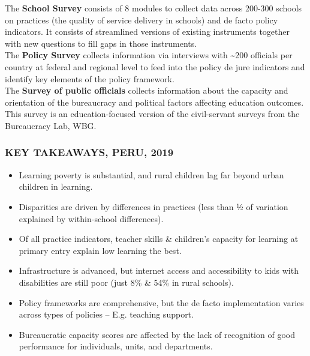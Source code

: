 \documentclass[twocolumn]{article}
\providecommand{\tightlist}{%
  \setlength{\itemsep}{0pt}\setlength{\parskip}{0pt}}
\begin{document}
The \textbf{School Survey} consists of 8 modules to collect data across
200-300 schools on practices (the quality of service delivery in
schools) and de facto policy indicators. It consists of streamlined
versions of existing instruments together with new questions to fill
gaps in those instruments.\\
The \textbf{Policy Survey} collects information via interviews with
\textasciitilde{}200 officials per country at federal and regional level
to feed into the policy de jure indicators and identify key elements of
the policy framework.\\
The \textbf{Survey of public officials} collects information about the
capacity and orientation of the bureaucracy and political factors
affecting education outcomes. This survey is an education-focused
version of the civil-servant surveys from the Bureaucracy Lab, WBG.

\hypertarget{key-takeaways-2019}{%
\subsubsection{\texorpdfstring{\textbf{KEY TAKEAWAYS, \uppercase{Peru},
2019}}{KEY TAKEAWAYS, , 2019}}\label{key-takeaways-2019}}

\begin{itemize}
\tightlist
\item
  Learning poverty is substantial, and rural children lag far beyond
  urban children in learning.
\item
  Disparities are driven by differences in practices (less than ½ of
  variation explained by within-school differences).
\item
  Of all practice indicators, teacher skills \& children's capacity for
  learning at primary entry explain low learning the best.
\item
  Infrastructure is advanced, but internet access and accessibility to
  kids with disabilities are still poor (just 8\% \& 54\% in rural
  schools).
\item
  Policy frameworks are comprehensive, but the de facto implementation
  varies across types of policies -- E.g. teaching support.
\item
  Bureaucratic capacity scores are affected by the lack of recognition
  of good performance for individuals, units, and departments.
\end{itemize}

\setlength\dashlinedash{0.2pt}
\setlength\dashlinegap{1.5pt}
\setlength\arrayrulewidth{0.3pt}
\end{document}
